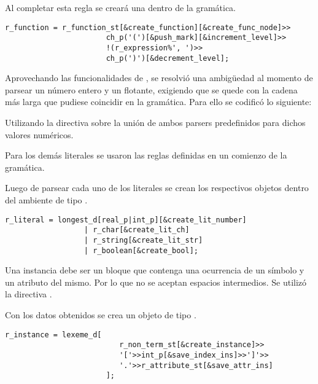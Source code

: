 Al completar esta regla se creará una  dentro de la gramática.

\begin{lstlisting}[float=!ht, columns=fullflexible, linewidth=12.5cm]
r_function = r_function_st[&create_function][&create_func_node]>>
                       ch_p('(')[&push_mark][&increment_level]>>
                       !(r_expression%', ')>>
                       ch_p(')')[&decrement_level];
\end{lstlisting}

Aprovechando las funcionalidades de \spirit, se resolvió una ambigüedad al momento de parsear un número entero y un flotante, exigiendo que se quede con la cadena más larga que pudiese coincidir en la gramática. Para ello se codificó lo siguiente:

\begin{center}\textbf{\large{}}\end{center}

Utilizando la directiva  sobre la unión de ambos parsers predefinidos para dichos valores numéricos.

Para los demás literales se usaron las reglas definidas en un comienzo de la gramática.

Luego de parsear cada uno de los literales se crean los respectivos objetos dentro del ambiente de tipo .

\begin{lstlisting}[columns=fullflexible, linewidth=10.5cm]
r_literal = longest_d[real_p|int_p][&create_lit_number]
                  | r_char[&create_lit_ch]
                  | r_string[&create_lit_str]
                  | r_boolean[&create_bool];
\end{lstlisting}

Una instancia debe ser un bloque que contenga una ocurrencia de un símbolo y un atributo del mismo. Por lo que no se aceptan espacios intermedios. Se utilizó la directiva .

Con los datos obtenidos se crea un objeto de tipo .

\begin{lstlisting}[columns=fullflexible, linewidth=9.5cm]
r_instance = lexeme_d[
                          r_non_term_st[&create_instance]>>
                          '['>>int_p[&save_index_ins]>>']'>>
                          '.'>>r_attribute_st[&save_attr_ins]
                       ];
\end{lstlisting}

